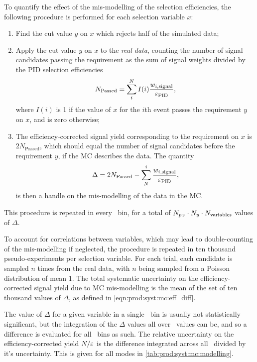 To quantify the effect of the mis-modelling of the selection efficiencies, the 
following procedure is performed for each selection variable $x$:
\begin{enumerate}
  \item Find the cut value $y$ on $x$ which rejects half of the simulated data;
  \item Apply the cut value $y$ on $x$ to the \emph{real data}, counting the 
    number of signal candidates passing the requirement as the sum of signal 
    weights divided by the \ac{PID} selection efficiencies
    \begin{equation}
      N_{\text{Passed}} = \sum_{i}^{N} I(i)\frac{w_{i,\text{signal}}}{\varepsilon_{\textnormal{PID}}},
    \end{equation}
    where $I(i)$ is 1 if the value of $x$ for the $i$th event passes the 
    requirement $y$ on $x$, and is zero otherwise;
  \item The efficiency-corrected signal yield corresponding to the requirement 
    on $x$ is $2N_{\text{Passed}}$, which should equal the number of signal 
    candidates before the requirement $y$, if the \ac{MC} describes the data.  
    The quantity
    \begin{equation}
      \Delta = 2N_{\text{Passed}} - \sum_{N}^{i} \frac{w_{i,\text{signal}}}{\varepsilon_{\textnormal{PID}}},
      \label{eqn:prod:syst:mc:eff_diff}
    \end{equation}
    is then a handle on the mis-modelling of the data in the \ac{MC}.
\end{enumerate}
This procedure is repeated in every \pTy\ bin, for a total of $N_{p_{\textnormal{T}}} \cdot 
N_{y} \cdot N_{\text{variables}}$ values of $\Delta$.

To account for correlations between variables, which may lead to 
double-counting of the mis-modelling if neglected, the procedure is repeated 
in ten thousand pseudo-experiments per selection variable.
For each trial, each candidate is sampled $n$ times from the real data, with 
$n$ being sampled from a Poisson distribution of mean 1.
The total systematic uncertainty on the efficiency-corrected signal yield due 
to \ac{MC} mis-modelling is the mean of the set of ten thousand values of $\Delta$, as defined in \cref{eqn:prod:syst:mc:eff_diff}.

The value of $\Delta$ for a given variable in a single \pTy\ bin is usually not 
statistically significant, but the integration of the $\Delta$ values all over 
\pTy\ values can be, and so a difference is evaluated for all \pTy\ bins as 
such.
The relative uncertainty on the efficiency-corrected yield $N/\varepsilon$ is the 
difference integrated across all \pTy\ divided by it's uncertainty.
This is given for all modes in \cref{tab:prod:syst:mc:modelling}.


